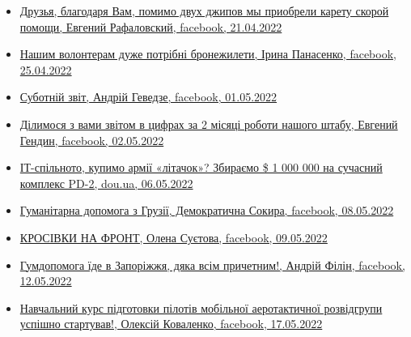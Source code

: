 \begin{itemize}
\item \hyperlink{21_04_2022.fb.rafalovskij_evgenij.kiev.1.kareta_skoroj_pomoschi}{%
Друзья, благодаря Вам, помимо двух джипов мы приобрели карету скорой помощи, Евгений Рафаловский, facebook, %
21.04.2022%
}

\item \hyperlink{25_04_2022.fb.panasenko_iryna.harkiv.1.volontery_broniki}{%
Нашим волонтерам дуже потрібні бронежилети, Ірина Панасенко, facebook, 25.04.2022%
}

\item \hyperlink{01_05_2022.fb.gevedze_andrij.kiev.1.subotnij_zvit}{%
Суботній звіт, Андрій Геведзе, facebook, 01.05.2022%
}

\item \hyperlink{02_05_2022.fb.gendin_evgenij.dnepropetrovsk.1.zvit}{%
Ділимося з вами звітом в цифрах за 2 місяці роботи нашого штабу, Евгений Гендин, facebook, 02.05.2022%
}

\item \hyperlink{06_05_2022.stz.pc.ua.dou.1.litachok}{%
ІТ-спільното, купимо армії «літачок»? Збираємо \$ 1 000 000 на сучасний комплекс PD-2, dou.ua, 06.05.2022%
}

\item \hyperlink{08_05_2022.fb.demsokyra.1.gumdopomoga_gruzia}{%
Гуманітарна допомога з Грузії, Демократична Сокира, facebook, 08.05.2022
}

\item \hyperlink{09_05_2022.fb.suetova_olena.kiev.1.krosivky_na_front}{%
КРОСІВКИ НА ФРОНТ, Олена Суєтова, facebook, 09.05.2022%
}

\item \hyperlink{12_05_2022.fb.filin_andrej.kiev.1.gumdopomoga}{%
Гумдопомога їде в Запоріжжя, дяка всім причетним!, Андрій Філін, facebook, 12.05.2022%
}

\item \hyperlink{17_05_2022.fb.kovalenko_oleksij.kiev.1.kurs_piloty}{%
Навчальний курс підготовки пілотів мобільної аеротактичної розвідгрупи успішно стартував!, Олексій Коваленко, %
facebook, 17.05.2022%
}

\end{itemize} %
